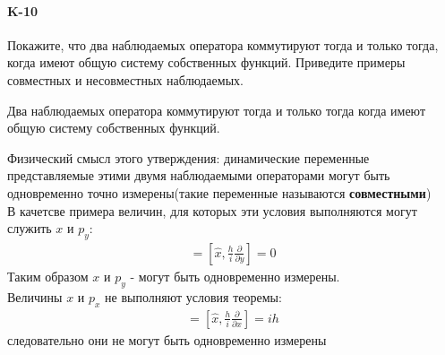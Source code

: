 \documentclass[__main__.tex]{subfiles}
\begin{document}
\paragraph{K-10}
Покажите, что два наблюдаемых оператора коммутируют тогда и только тогда, когда имеют общую систему собственных функций. Приведите примеры совместных и несовместных наблюдаемых.
\begin{theorem}
Два наблюдаемых оператора коммутируют тогда и только тогда когда имеют общую систему собственных функций.
\end{theorem}
Физический смысл этого утверждения: динамические переменные представляемые этими двумя наблюдаемыми операторами могут быть одновременно точно измерены(такие переменные называются \textbf{совместными})\\

В качетсве примера величин, для которых эти условия выполняются могут служить $x$ и $p_y$: 
\begin{gather*}
[\hat{x},\hat{p_y}] = \left[\hat{x},\frac{h}{i}\frac{\partial}{\partial y}\right] = 0
\end{gather*}
Таким образом $x$ и $p_y$ - могут быть одновременно измерены.\\
Величины $x$ и $p_x$ не выполняют условия теоремы:
\begin{gather*}
[\hat{x},\hat{p_x}] = \left[\hat{x},\frac{h}{i}\frac{\partial}{\partial x}\right] = ih
\end{gather*}
следовательно они не могут быть одновременно измерены
\end{document}
